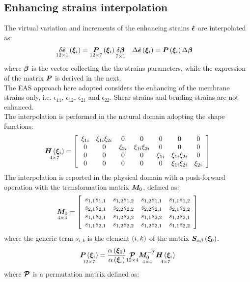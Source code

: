 \subsection{Enhancing strains interpolation}
The virtual variation and increments of the enhancing strains $\T{\hat{\epsilon}}$ are interpolated as:
\begin{align}
\underset{12 \times 1}{\delta \hat{\T{\epsilon}}} \valxii & = \underset{12 \times 7}{\T{P}} \valxii \underset{7 \times 1}{ \delta \T{\beta}} &  \Delta \hat{\T{\epsilon}}\valxii & = \T{P}\valxii \Delta \T{\beta}
\end{align}
where $\T{\beta}$ is the vector collecting the the strains parameters, while the expression of the matrix $\T{P}$ is derived in the next. \\
The EAS approach here adopted considers the enhancing of the membrane strains only, i.e. $\epsilon_{11}$, $\epsilon_{12}$, $\epsilon_{21}$ and $\epsilon_{22}$. Shear strains and bending strains are not enhanced.\\
The interpolation is performed in the natural domain adopting the shape functions:
\begin{equation}
\underset{ 4 \times 7 } { \T{ H } \valxii } =
\sqbr{ \matr{ c c c c c c c }{
\xi_{1i} & \xi_{1i} \xi_{2i} &  0    &      0      &   0   &      0      &   0     \\
  0   &      0      & \xi_{2i} & \xi_{1i} \xi_{2i} &   0   &      0      &   0     \\
  0   &      0      &  0    &      0      & \xi_{1i} & \xi_{1i} \xi_{2i} &   0      \\
  0   &      0      &  0    &      0      &   0   & \xi_{1i} \xi_{2i} & \xi_{2i}
}}
\end{equation}
The interpolation is reported in the physical domain with a push-forward operation with the transformation matrix $\T{M}_0$, defined as:
\begin{equation}
\underset{ 4 \times 4 } { \T{M}_0 } =
\sqbr{ \matr{ c c c c}{
s_{ 1, 1 } s_{ 1, 1 } & s_{ 1, 2 } s_{ 1, 2 } & s_{ 1, 2 } s_{ 1, 1 } &  s_{ 1, 1 } s_{ 1, 2 } \\
s_{ 2, 1 } s_{ 2, 1 } & s_{ 2, 2 } s_{ 2, 2 } & s_{ 2, 2 } s_{ 2, 1 } &  s_{ 2, 1 } s_{ 2, 2 } \\
s_{ 1, 1 } s_{ 2, 1 } & s_{ 1, 2 } s_{ 2, 2 } & s_{ 1, 1 } s_{ 2, 2 } &  s_{ 1, 2 } s_{ 2, 1 } \\
s_{ 1, 1 } s_{ 2, 1 } & s_{ 1, 2 } s_{ 2, 2 } & s_{ 1, 2 } s_{ 2, 1 } &  s_{ 1, 1 } s_{ 2, 2 }
}}
\end{equation}
where the generic term $s_{ i, k }$ is the element $\plbr{i,k}$ of the matrix $\T{ S }_{ \alpha \beta } \valxio$.\\
\begin{equation}
\underset{ 12 \times 7 }{ \T{ P } \valxii } =
\fracd{ \alpha \valxio }{ \alpha \valxii } \underset{ 12 \times 4  }{ \T{\mathcal{P}} } \underset{ 4 \times 4 }{ \T{ M }_{0}^{-T} } \underset{ 4 \times 7 }{ \T{H} \valxii }
\end{equation}
where $\T{\mathcal{P}}$ is a permutation matrix defined as:

